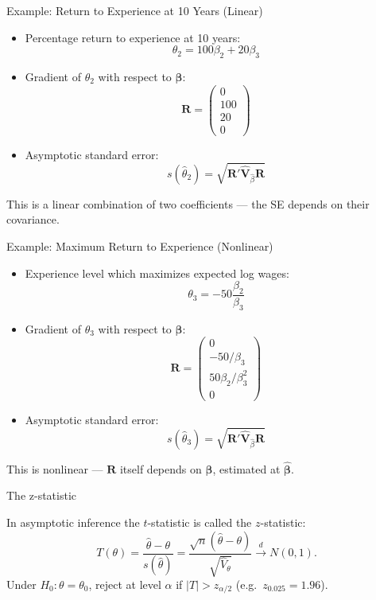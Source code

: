 \documentclass[aspectratio=169, handout, t]{beamer}
\numberwithin{equation}{section}
\begin{document}

\begin{frame}{Example: Return to Experience at 10 Years (Linear)}
\begin{itemize}
\item Percentage return to experience at 10 years:
\[
\theta_2 = 100\beta_2 + 20\beta_3
\]
\item Gradient of $\theta_2$ with respect to $\bm{\beta}$:
\[
\bm{R} =
\begin{pmatrix}
0 \\
100 \\
20 \\
0
\end{pmatrix}
\]
\item Asymptotic standard error:
\[
s(\hat{\theta}_2) = \sqrt{\bm{R}' \hat{\bm{V}}_{\hat{\beta}} \bm{R}}
\]
\end{itemize}

This is a linear combination of two coefficients --- the SE depends on their covariance.

\end{frame}


\begin{frame}{Example: Maximum Return to Experience (Nonlinear)}
\begin{itemize}
\item Experience level which maximizes expected log wages:
\[
\theta_3 = -50\frac{\beta_2}{\beta_3}
\]
\item Gradient of $\theta_3$ with respect to $\bm{\beta}$:
\[
\bm{R} =
\begin{pmatrix}
0 \\
-50/\beta_3 \\
50\beta_2/\beta_3^2 \\
0
\end{pmatrix}
\]
\item Asymptotic standard error:
\[
s(\hat{\theta}_3) = \sqrt{\bm{R}' \hat{\bm{V}}_{\hat{\beta}} \bm{R}}
\]
\end{itemize}

This is nonlinear --- $\bm{R}$ itself depends on $\bm{\beta}$, estimated at $\hat{\bm{\beta}}$.

\end{frame}


\begin{frame}{The z-statistic}

In asymptotic inference the $t$-statistic is called the $z$-statistic:
\[
T(\theta) = \frac{\hat{\theta} - \theta}{s(\hat{\theta})}
= \frac{\sqrt n(\hat{\theta} - \theta)}{\sqrt{\hat{V}_\theta}}
\xrightarrow{d} N(0,1).
\]
Under $H_0: \theta = \theta_0$, reject at level $\alpha$ if $|T| > z_{\alpha/2}$ (e.g.\ $z_{0.025} = 1.96$).

\end{frame}
\end{document}

